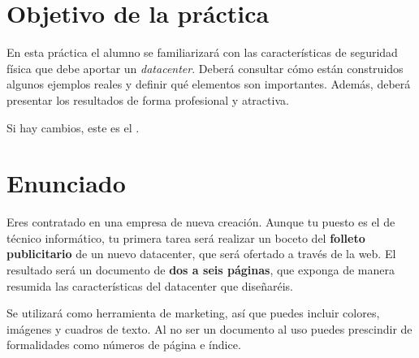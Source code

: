 
\usepackage{eurosym}
\usepackage{needspace}




\renewcommand{\hmwkTitle}{Publicidad de datacenter}
\renewcommand{\hmwkClass}{Seguridad Informática}

\usepackage{blindtext}








\section{Objetivo de la práctica}
En esta práctica el alumno se familiarizará con las características de seguridad física que debe aportar un \textit{datacenter}. Deberá consultar cómo están construidos algunos ejemplos reales y definir qué elementos son importantes. Además, deberá presentar los resultados de forma profesional y atractiva.

Si hay cambios, este es el  .




\section{Enunciado}
Eres contratado en una empresa de nueva creación. Aunque tu puesto es el de técnico informático, tu primera tarea será realizar un boceto del \textbf{folleto publicitario} de un nuevo datacenter, que será ofertado a través de la web.  El resultado será un documento de \textbf{dos a seis páginas}, que exponga de manera resumida las características del datacenter que diseñaréis.

Se utilizará como herramienta de marketing, así que puedes incluir colores, imágenes y cuadros de texto. Al no ser un documento al uso puedes prescindir de formalidades como números de página e índice.


